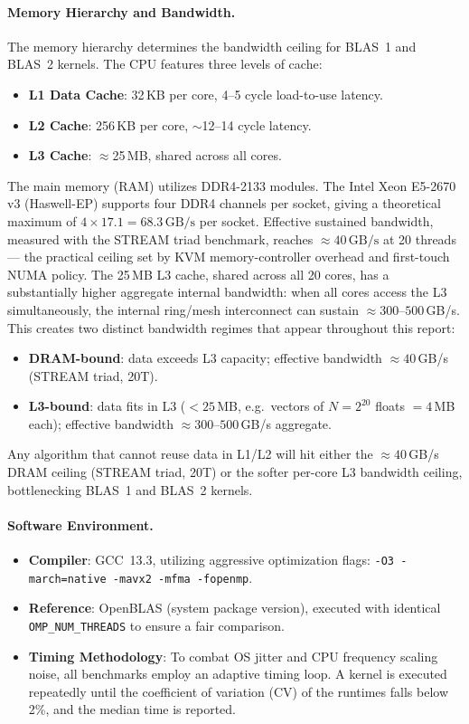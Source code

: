 \documentclass[11pt,a4paper]{article}
\begin{document}
\paragraph{Memory Hierarchy and Bandwidth.}
The memory hierarchy determines the bandwidth ceiling for BLAS~1 and BLAS~2 kernels. The CPU features three levels of cache:
\begin{itemize}
    \item \textbf{L1 Data Cache}: 32\,KB per core, 4--5 cycle load-to-use latency.
    \item \textbf{L2 Cache}: 256\,KB per core, $\sim$12--14 cycle latency.
    \item \textbf{L3 Cache}: $\approx$25\,MB, shared across all cores.
\end{itemize}
The main memory (RAM) utilizes DDR4-2133 modules. The Intel Xeon E5-2670 v3 (Haswell-EP) supports four DDR4 channels per socket, giving a theoretical maximum of $4 \times 17.1 = 68.3\,\text{GB/s}$ per socket. Effective sustained bandwidth, measured with the STREAM triad benchmark, reaches $\approx 40\,\text{GB/s}$ at 20 threads — the practical ceiling set by KVM memory-controller overhead and first-touch NUMA policy.
The 25\,MB L3 cache, shared across all 20 cores, has a substantially higher aggregate internal bandwidth: when all cores access the L3 simultaneously, the internal ring/mesh interconnect can sustain $\approx 300$--$500$\,GB/s. This creates two distinct bandwidth regimes that appear throughout this report:
\begin{itemize}
    \item \textbf{DRAM-bound}: data exceeds L3 capacity; effective bandwidth $\approx 40$\,GB/s (STREAM triad, 20T).
    \item \textbf{L3-bound}: data fits in L3 ($< 25$\,MB, e.g.\ vectors of $N = 2^{20}$ floats $= 4$\,MB each); effective bandwidth $\approx 300$--$500$\,GB/s aggregate.
\end{itemize}
Any algorithm that cannot reuse data in L1/L2 will hit either the $\approx 40$\,GB/s DRAM ceiling (STREAM triad, 20T) or the softer per-core L3 bandwidth ceiling, bottlenecking BLAS~1 and BLAS~2 kernels.

\paragraph{Software Environment.}
\begin{itemize}
  \item \textbf{Compiler}: GCC~13.3, utilizing aggressive optimization flags: \texttt{-O3 -march=native -mavx2 -mfma -fopenmp}.
  \item \textbf{Reference}: OpenBLAS (system package version), executed with identical \texttt{OMP\_NUM\_THREADS} to ensure a fair comparison.
  \item \textbf{Timing Methodology}: To combat OS jitter and CPU frequency scaling noise, all benchmarks employ an adaptive timing loop. A kernel is executed repeatedly until the coefficient of variation (CV) of the runtimes falls below 2\%, and the median time is reported.
\end{itemize}
\end{document}
